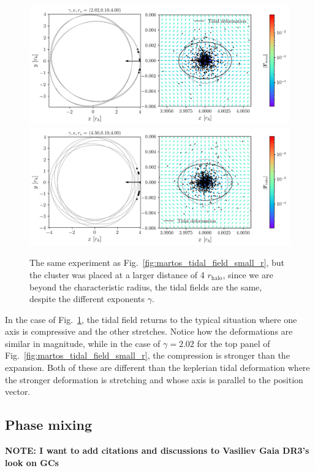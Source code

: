             \begin{figure}
                \includegraphics[width=\linewidth]{images/martos_tidal_field_202_10_400.png}
                \includegraphics[width=\linewidth]{images/martos_tidal_field_450_10_400.png}
                \caption{The same experiment as Fig.~\ref{fig:martos_tidal_field_small_r}, but the cluster was placed at a larger distance of 4 $r_\textrm{halo}$, since we are beyond the characteristic radius, the tidal fields are the same, despite the different exponents $\gamma$.}
                \label{fig:martos_tidal_field_big_r}
            \end{figure}

            In the case of Fig.~\ref{fig:martos_tidal_field_big_r}, the tidal field returns to the typical situation where one axis is compressive and the other stretches. Notice how the deformations are similar in magnitude, while in the case of $\gamma=2.02$ for the top panel of Fig.~\ref{fig:martos_tidal_field_small_r}, the compression is stronger than the expansion. Both of these are different than the keplerian tidal deformation where the stronger deformation is stretching and whose axis is parallel to the position vector. 






    \subsection{Phase mixing}
        \textbf{NOTE: I want to add citations and discussions to Vasiliev Gaia DR3's look on GCs}

